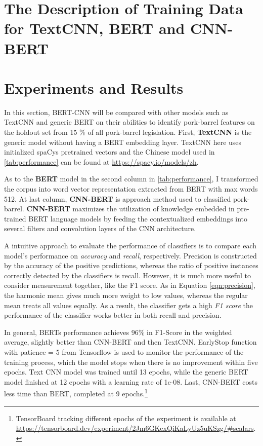 
\section{The Description of Training Data for TextCNN, BERT and CNN-BERT}



\clearpage

\section{Experiments and Results\label{tag:performance}}

In this section, BERT-CNN will be compared with other models such as TextCNN and generic BERT on their abilities to identify pork-barrel features on the holdout set from 15 \% of all pork-barrel legislation. First, \textbf{TextCNN} is the generic model without having a BERT embedding layer. TextCNN here uses initialized spaCy\textquotesingle s pretrained vectors and the Chinese model used in \autoref{tab:performance} can be found at \href{https://spacy.io/models/zh}{https://spacy.io/models/zh}.

As to the \textbf{BERT} model in the second column in \autoref{tab:performance}, I transformed the corpus into word vector representation extracted from BERT with max words 512. At last column, \textbf{CNN-BERT} is approach method used to classified pork-barrel. \textbf{CNN-BERT} maximizes the utilization of knowledge embedded in pre-trained BERT language models by feeding the  contextualized embeddings into several filters and convolution layers of the CNN architecture. 

A intuitive approach to evaluate the performance of classifiers is to compare each model's performance on \textit{accuracy} and \textit{recall}, respectively. Precision is constructed by the accuracy of the positive predictions, whereas the ratio of positive instances correctly detected by the classifiers is recall. However, it is much more useful to consider measurement together, like the F1 score. As in Equation \ref{eqn:precision}, the harmonic mean gives much more weight to low values, whereas the regular mean treats all values equally. As a result, the classifier gets a high \textit{F1 score} the performance of the classifier works better in both recall and precision.

In general, BERT\textquotesingle s performance achieves 96\% in F1-Score in the weighted average, slightly better than  CNN-BERT and then TextCNN. EarlyStop function with patience = 5 from Tensorflow is used to monitor the performance of the training process, which the model stops when there is no improvement within five epochs. Text CNN model was trained until 13 epochs, while the generic BERT model finished at 12 epochs with a learning rate of 1e-08. Last, CNN-BERT costs less time than BERT, completed at 9 epochs.\footnote{TensorBoard tracking different epochs of the experiment is available at \href{https://tensorboard.dev/experiment/2Jm6GKexQiKaLyUz5uKSzg/\#scalars}{https://tensorboard.dev/experiment/2Jm6GKexQiKaLyUz5uKSzg/\#scalars}.}



